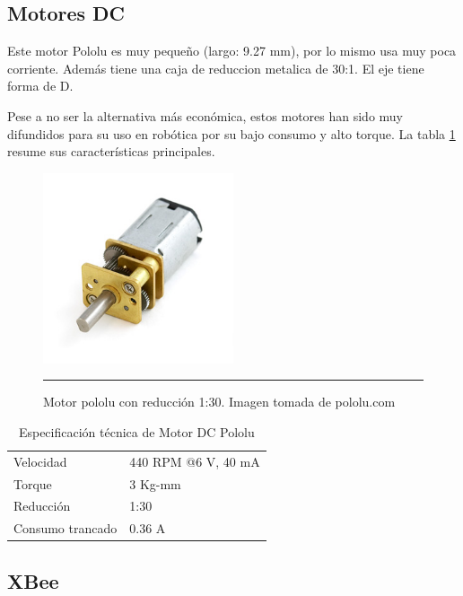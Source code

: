 \subsection{Motores DC}

Este motor Pololu es muy pequeño (largo: 9.27 mm), por lo mismo usa muy poca corriente. Además tiene una caja de reduccion metalica de 30:1. El eje tiene forma de D.

Pese a no ser la alternativa más económica, estos motores han sido muy difundidos para su uso en robótica por su bajo consumo y alto torque. La tabla \ref{table:Motor} resume sus características principales.

\begin{figure}[htbp]
	\centering
		\includegraphics[width=0.5\textwidth]{./Figures/MODI/Motorpololu.jpg}
		\rule{35em}{0.5pt}
	\caption[MotorDC]{Motor pololu con reducción 1:30. Imagen tomada de pololu.com}
	\label{fig:MotorDC}
\end{figure}

\begin{table}
    \begin{tabular}{l|l}
    Velocidad &  440 RPM @6 V, 40 mA\\
    Torque                & 3 Kg-mm  \\
    Reducción             & 1:30     \\
    Consumo trancado      & 0.36 A   \\
    \end{tabular}
        \caption[Motor]{Especificación técnica de Motor DC Pololu}
	\label{table:Motor}
\end{table}

\subsection{XBee}

